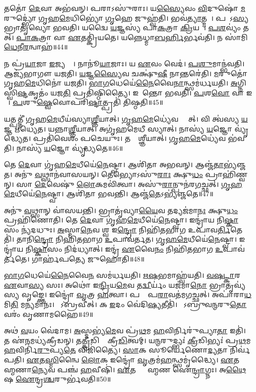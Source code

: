 𑌤𑌤𑍋॑ \ul{𑌦𑍇}𑌵𑌾 𑌅𑌭॑𑌵𑌨𑍍।
𑌪𑌰𑌾𑌽𑌸𑍁॑𑌰𑌾𑌃।
𑌯\ul{𑌸𑍍𑌯𑍈}𑌵𑌂 \ul{𑌵𑌿}𑌦𑍁𑌷𑍋॑ \ul{𑌮}𑌰𑍁𑌦𑍍𑌭𑍍𑌯𑍋॑ 𑌗𑍃𑌹\ul{𑌮𑍇}𑌧𑌿𑌭𑍍𑌯𑍋॑ \ul{𑌗𑍃}𑌹𑍇 𑌜𑍁𑌹𑍍𑌵॑𑌤𑌿।
𑌭𑌵॑\ul{𑌤𑍍𑌯𑌾}𑌤𑍍𑌮𑌨𑌾᳚।
𑌪𑌰𑌾᳚𑌽\ul{𑌸𑍍𑌯} 𑌭𑍍𑌰𑌾𑌤𑍃॑𑌵𑍍𑌯𑍋 𑌭𑌵𑌤𑌿।
𑌯𑌦𑍍𑌵𑍈 \ul{𑌯}𑌜𑍍𑌞𑌸𑍍𑌯॑ 𑌪𑌾\ul{𑌕}𑌤𑍍𑌰𑌾 \ul{𑌕𑍍𑌰𑌿}𑌯𑌤𑍇᳚।
\ul{𑌪}\ul{𑌶}𑌵𑍍𑌯𑌂॑ 𑌤𑌤𑍍।
\ul{𑌪𑌾}\ul{𑌕}𑌤𑍍𑌰𑌾 𑌵𑌾 \ul{𑌏}𑌤𑌤𑍍𑌕𑍍𑌰𑌿॑𑌯𑌤𑍇।
𑌯𑌨𑍍𑌨𑍇𑌧𑍍𑌮𑌾\ul{𑌬}\ul{𑌰𑍍}𑌹𑌿𑌰𑍍𑌭𑌵॑𑌤𑌿।
𑌨 𑌸𑌾॑𑌮𑌿\ul{𑌧𑍇}𑌨𑍀\ul{𑌰}𑌨𑍍𑌵𑌾𑌹॑॥44॥

𑌨 𑌪𑍍𑌰॑\ul{𑌯𑌾}𑌜𑌾 \ul{𑌇}𑌜𑍍𑌯𑌨𑍍𑌤𑍇᳚।
𑌨𑌾𑌨𑍂॑\ul{𑌯𑌾}𑌜𑌾𑌃।
𑌯 \ul{𑌏}𑌵𑌂 𑌵𑍇𑌦॑।
\ul{𑌪}\ul{𑌶𑍁}𑌮𑌾𑌨𑍍𑌭॑𑌵𑌤𑌿।
𑌆𑌜𑍍𑌯॑𑌭𑌾𑌗𑍗 𑌯𑌜𑌤𑌿।
\ul{𑌯}𑌜𑍍𑌞\ul{𑌸𑍍𑌯𑍈}𑌵 𑌚𑌕𑍍𑌷𑍁॑\ul{𑌷𑍀} 𑌨𑌾𑌨𑍍𑌤𑌰𑍇॑𑌤𑌿।
\ul{𑌮}𑌰𑍁𑌤𑍋॑ 𑌗𑍃𑌹\ul{𑌮𑍇}𑌧𑌿𑌨𑍋॑ 𑌯𑌜𑌤𑌿।
\ul{𑌭𑌾}\ul{𑌗}𑌧𑍇𑌯𑍇॑\ul{𑌨𑍈}𑌵𑍈\ul{𑌨𑌾}𑌨𑍍𑌥𑍍𑌸𑌮॑𑌰𑍍𑌧\-𑌯𑌤𑌿।
\ul{𑌅}𑌗𑍍𑌨𑌿𑌸𑍍𑌵𑌿॑\ul{𑌷𑍍𑌟}𑌕𑍃𑌤𑌂॑ 𑌯𑌜\ul{𑌤𑌿} 𑌪𑍍𑌰𑌤𑌿॑\-𑌷𑍍𑌠𑌿𑌤𑍍𑌯𑍈।
𑌇𑌡𑌾᳚𑌨𑍍𑌤𑍋 𑌭𑌵𑌤𑌿।
\ul{𑌪}𑌶\ul{𑌵𑍋} 𑌵𑌾 𑌇𑌡𑌾᳚।
\ul{𑌪}𑌶𑍁\ul{𑌷𑍍𑌵𑍇}𑌵𑍋𑌪𑌰𑌿॑\ul{𑌷𑍍𑌟𑌾}𑌤𑍍𑌪𑍍𑌰𑌤𑌿॑ 𑌤𑌿𑌷𑍍𑌠𑌤𑌿॥45॥

𑌯𑌤𑍍𑌪𑌤𑍍𑌨𑍀॑ 𑌗𑍃𑌹\ul{𑌮𑍇}𑌧𑍀𑌯॑𑌸𑍍𑌯𑌾\ul{𑌶𑍍𑌞𑍀}𑌯𑌾𑌤𑍍।
\ul{𑌗𑍃}\ul{𑌹}\ul{𑌮𑍇}𑌧𑍍𑌯𑍇॑𑌵 𑌸𑍍𑌯𑌾᳚𑌤𑍍।
𑌵𑌿 𑌤𑍍𑌵॑𑌸𑍍𑌯 \ul{𑌯}𑌜𑍍𑌞 𑌋॑𑌧𑍍𑌯𑍇𑌤।
𑌯𑌨𑍍𑌨𑌾\ul{𑌶𑍍𑌞𑍀}𑌯𑌾𑌤𑍍।
𑌅𑌗𑍃॑𑌹𑌮𑍇𑌧𑍀 𑌸𑍍𑌯𑌾𑌤𑍍।
𑌨𑌾𑌸𑍍𑌯॑ \ul{𑌯}𑌜𑍍𑌞𑍋 𑌵𑍍𑌯𑍃॑𑌦𑍍𑌧𑍍𑌯𑍇𑌤।
𑌪𑍍𑌰𑌤𑌿॑\-𑌵𑍇𑌶𑌂 𑌪𑌚𑍇𑌯𑍁𑌃।
𑌤𑌸𑍍𑌯𑌾᳚𑌶𑍍𑌞𑍀𑌯𑌾𑌤𑍍।
\ul{𑌗𑍃}\ul{𑌹}\ul{𑌮𑍇}𑌧𑍍𑌯𑍇॑𑌵 𑌭॑𑌵𑌤𑌿।
𑌨𑌾𑌸𑍍𑌯॑ \ul{𑌯}𑌜𑍍𑌞𑍋 𑌵𑍍𑌯𑍃॑𑌦𑍍𑌧𑍍𑌯𑌤𑍇॥46॥

𑌤𑍇 \ul{𑌦𑍇}𑌵𑌾 𑌗𑍃॑𑌹\ul{𑌮𑍇}𑌧𑍀𑌯𑍇॑\ul{𑌨𑍇}𑌷𑍍𑌟𑍍𑌵𑌾।
𑌆𑌶𑌿॑𑌤𑌾 𑌅𑌭𑌵𑌨𑍍।
𑌆𑌞𑍍𑌜॑\ul{𑌤𑌾}𑌭𑍍𑌯॑𑌞𑍍𑌜𑌤।
𑌅𑌨𑍁॑ \ul{𑌵}𑌥𑍍𑌸𑌾𑌨॑𑌵𑌾𑌸𑌯𑌨𑍍।
𑌤𑍇𑌭𑍍𑌯𑍋\-𑌽𑌸𑍁॑\ul{𑌰𑌾𑌃} 𑌕𑍍𑌷𑍁\ul{𑌧𑌂} 𑌪𑍍𑌰𑌾𑌹𑌿॑𑌣𑍍𑌵𑌨𑍍।
𑌸𑌾 \ul{𑌦𑍇}𑌵𑍇𑌷𑍁॑ \ul{𑌲𑍋}𑌕𑌮𑌵𑌿॑𑌤𑍍𑌵𑌾।
𑌅𑌸𑍁॑\ul{𑌰𑌾}𑌨𑍍𑌪𑍁𑌨॑𑌰𑌗𑌚𑍍𑌛𑌤𑍍।
\ul{𑌗𑍃}\ul{𑌹}\ul{𑌮𑍇}𑌧𑍀𑌯𑍇॑\ul{𑌨𑍇}𑌷𑍍𑌟𑍍𑌵𑌾।
𑌆𑌶𑌿॑𑌤𑌾 𑌭𑌵𑌨𑍍𑌤𑌿।
𑌆𑌞𑍍𑌜॑\ul{𑌤𑍇}\-𑌽𑌭𑍍𑌯॑𑌞𑍍𑌜𑌤𑍇॥47॥

𑌅𑌨𑍁॑ \ul{𑌵}𑌥𑍍𑌸𑌾𑌨𑍍 𑌵𑌾॑𑌸𑌯𑌨𑍍𑌤𑌿।
𑌭𑍍𑌰𑌾𑌤𑍃॑𑌵𑍍𑌯𑌾\ul{𑌯𑍈}𑌵 𑌤𑌦𑍍𑌯𑌜॑𑌮𑌾\ul{𑌨𑌃} 𑌕𑍍𑌷𑍁\ul{𑌧𑌂} 𑌪𑍍𑌰𑌹𑌿॑𑌣𑍋𑌤𑌿।
𑌤𑍇 \ul{𑌦𑍇}𑌵𑌾 𑌗𑍃॑𑌹\ul{𑌮𑍇}𑌧𑍀𑌯𑍇॑\ul{𑌨𑍇}𑌷𑍍𑌟𑍍𑌵𑌾।
𑌇𑌨𑍍𑌦𑍍𑌰𑌾॑𑌯 𑌨𑌿\ul{𑌷𑍍𑌕𑌾}𑌸𑌂 𑌨𑍍𑌯॑𑌦𑌧𑍁𑌃।
\ul{𑌅}𑌸𑍍𑌮𑌾\ul{𑌨𑍇}𑌵 𑌶𑍍𑌵 𑌇\ul{𑌨𑍍𑌦𑍍𑌰𑍋} 𑌨𑌿𑌹𑌿॑𑌤𑌭𑌾𑌗 𑌉𑌪𑌾𑌵\ul{𑌰𑍍𑌤𑌿}𑌤𑍇𑌤𑌿॑।
𑌤𑌾𑌨𑌿\ul{𑌨𑍍𑌦𑍍𑌰𑍋} 𑌨𑌿𑌹𑌿॑𑌤𑌭𑌾𑌗 \ul{𑌉}𑌪𑌾𑌵॑𑌰𑍍𑌤𑌤।
\ul{𑌗𑍃}\ul{𑌹}\ul{𑌮𑍇}𑌧𑍀𑌯𑍇॑\ul{𑌨𑍇}𑌷𑍍𑌟𑍍𑌵𑌾।
𑌇𑌨𑍍𑌦𑍍𑌰𑌾॑𑌯 𑌨𑌿\ul{𑌷𑍍𑌕𑌾}𑌸𑌂 𑌨𑌿𑌦॑𑌧𑍍𑌯𑌾𑌤𑍍।
𑌇𑌨𑍍𑌦𑍍𑌰॑ \ul{𑌏}𑌵𑍈\ul{𑌨𑌂} 𑌨𑌿𑌹𑌿॑𑌤𑌭𑌾𑌗 \ul{𑌉}𑌪𑌾𑌵॑𑌰𑍍𑌤𑌤𑍇।
𑌗𑌾𑌰𑍍\mbox{}𑌹॑𑌪𑌤𑍍𑌯𑍇 𑌜𑍁𑌹𑍋𑌤𑌿॥48॥

\ul{𑌭𑌾}\ul{𑌗}𑌧𑍇𑌯𑍇॑\ul{𑌨𑍈}𑌵𑍈\ul{𑌨}\ul{} 𑌸𑌮॑𑌰𑍍𑌧𑌯𑌤𑌿।
\ul{𑌋}\ul{𑌷}𑌭𑌮𑌾𑌹𑍍𑌵॑𑌯𑌤𑌿।
\ul{𑌵}\ul{𑌷}\ul{𑌟𑍍𑌕𑌾}𑌰 \ul{𑌏}𑌵𑌾\ul{𑌸𑍍𑌯} 𑌸𑌃।
𑌅𑌥𑍋॑ 𑌇\ul{𑌨𑍍𑌦𑍍𑌰𑌿}𑌯\ul{𑌮𑍇}𑌵 𑌤\ul{𑌦𑍍𑌵𑍀}𑌰𑍍𑌯𑌂॑ 𑌯𑌜॑𑌮𑌾\ul{𑌨𑍋} 𑌭𑍍𑌰𑌾𑌤𑍃𑌵𑍍𑌯॑𑌸𑍍𑌯 𑌵𑍃𑌙𑍍𑌕𑍍𑌤𑍇।
𑌇𑌨𑍍𑌦𑍍𑌰𑍋॑ \ul{𑌵𑍃}𑌤𑍍𑌰 \ul{𑌹}𑌤𑍍𑌵𑌾।
𑌪𑌰𑌾𑌂᳚ 𑌪\ul{𑌰𑌾}𑌵𑌤॑𑌮𑌗𑌚𑍍𑌛𑌤𑍍।
𑌅𑌪𑌾॑𑌰𑌾\ul{𑌧}𑌮𑌿\ul{𑌤𑌿} 𑌮𑌨𑍍𑌯॑𑌮𑌾𑌨𑌃।
𑌸𑍋᳚𑌽𑌬𑍍𑌰𑌵𑍀𑌤𑍍।
𑌕 \ul{𑌇}𑌦𑌂 𑌵𑍇॑𑌦𑌿\ul{𑌷𑍍𑌯}𑌤𑍀𑌤𑌿॑।
𑌤𑍇᳚𑌽𑌬𑍍𑌰𑍁𑌵\ul{𑌨𑍍𑌮}𑌰𑍁\ul{𑌤𑍋} 𑌵𑌰𑌂॑ 𑌵𑍃𑌣𑌾𑌮𑌹𑍈॥49॥

𑌅𑌥॑ \ul{𑌵}𑌯𑌂 𑌵𑍇॑𑌦𑌾𑌮।
\ul{𑌅}𑌸𑍍𑌮𑌭𑍍𑌯॑\ul{𑌮𑍇}𑌵 𑌪𑍍𑌰॑\ul{𑌥}𑌮 \ul{𑌹}𑌵𑌿𑌰𑍍𑌨𑌿𑌰𑍁॑𑌪𑍍𑌯𑌾\ul{𑌤𑌾} 𑌇𑌤𑌿॑।
𑌤 𑌏॑\ul{𑌨}𑌮𑌧𑍍𑌯॑𑌕𑍍𑌰𑍀𑌡𑌨𑍍।
𑌤\ul{𑌤𑍍𑌕𑍍𑌰𑍀}𑌡𑌿𑌨𑌾𑌂᳚ 𑌕𑍍𑌰𑍀\ul{𑌡𑌿}𑌤𑍍𑌵𑌮𑍍।
𑌯\ul{𑌨𑍍𑌮}𑌰𑍁𑌦𑍍𑌭𑍍𑌯𑌃॑ \ul{𑌕𑍍𑌰𑍀}𑌡𑌿𑌭𑍍𑌯𑌃॑ 𑌪𑍍𑌰\ul{𑌥}𑌮 \ul{𑌹}𑌵𑌿𑌰𑍍𑌨𑌿॑\ul{𑌰𑍁}𑌪𑍍𑌯\ul{𑌤𑍇} 𑌵𑌿𑌜𑌿॑𑌤𑍍𑌯𑍈।
\ul{𑌸𑌾}𑌕 𑌸𑍂𑌰𑍍𑌯𑍇॑𑌣𑍋\ul{𑌦𑍍𑌯}𑌤𑌾 𑌨𑌿𑌰𑍍𑌵॑𑌪𑌤𑌿।
\ul{𑌏}𑌤\ul{𑌸𑍍𑌮𑌿}𑌨𑍍𑌵𑍈 \ul{𑌲𑍋}𑌕 𑌇𑌨𑍍𑌦𑍍𑌰𑍋॑ \ul{𑌵𑍃}𑌤𑍍𑌰𑌮॑\ul{𑌹}𑌨𑍍𑌥𑍍𑌸𑌮𑍃॑𑌦𑍍𑌧𑍍𑌯𑍈।
\ul{𑌏}𑌤𑌦𑍍𑌬𑍍𑌰𑌾᳚𑌹𑍍𑌮𑌣𑌾\ul{𑌨𑍍𑌯𑍇}𑌵 𑌪𑌞𑍍𑌚॑ \ul{𑌹}𑌵𑍀𑌷𑌿॑।
\ul{𑌏}𑌤𑌦𑍍𑌬𑍍𑌰𑌾᳚𑌹𑍍𑌮𑌣 𑌐\ul{𑌨𑍍𑌦𑍍𑌰𑌾}𑌗𑍍𑌨𑌃।
𑌅\ul{𑌥𑍈}𑌷 \ul{𑌐}𑌨𑍍𑌦𑍍𑌰\ul{𑌶𑍍𑌚}𑌰𑍁𑌰𑍍𑌭॑𑌵𑌤𑌿॥50॥

